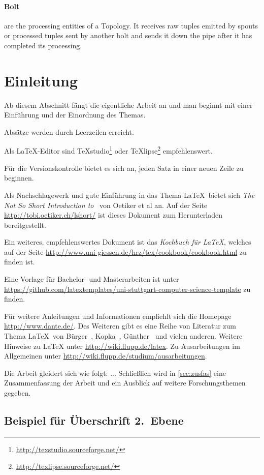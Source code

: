 \documentclass[runningheads,a4paper]{llncs}[2015/06/24]
\begin{document}
\paragraph{Bolt} are the processing entities of a Topology. It receives raw tuples emitted by spouts or processed tuples sent by another bolt and sends it down the pipe after it has completed its processing.

\section{Einleitung}
Ab diesem Abschnitt fängt die eigentliche Arbeit an und man beginnt mit einer Einführung und der Einordnung des Themas.

Absätze werden durch Leerzeilen erreicht.

Als \LaTeX-Editor sind TeXstudio\footnote{\url{http://texstudio.sourceforge.net/}} oder TeXlipse\footnote{\url{http://texlipse.sourceforge.net/}} empfehlenswert.

Für die Versionskontrolle bietet es sich an, jeden Satz in einer neuen Zeile zu beginnen.

Als Nachschlagewerk und gute Einführung in das Thema \LaTeX\ bietet sich \emph{The Not So Short Introduction to \LaTeXe}\ von Oetiker et al an.
Auf der Seite \url{http://tobi.oetiker.ch/lshort/} ist dieses Dokument zum Herunterladen bereitgestellt.

Ein weiteres, empfehlenswertes Dokument ist das \emph{Kochbuch für \LaTeX{}}, welches auf der Seite \url{http://www.uni-giessen.de/hrz/tex/cookbook/cookbook.html} zu finden ist.

Eine Vorlage für Bachelor- und Masterarbeiten ist unter \url{https://github.com/latextemplates/uni-stuttgart-computer-science-template} zu finden.

Für weitere Anleitungen und Informationen empfiehlt sich die Homepage \url{http://www.dante.de/}.
Des Weiteren gibt es eine Reihe von Literatur zum Thema \LaTeX\ von Bürger~\cite{buerger}, Kopka~\cite{kopka}, Günther~\cite{guenther} und vielen anderen.
Weitere Hinweise zu \LaTeX{} unter \url{http://wiki.flupp.de/latex}.
Zu Ausarbeitungen im Allgemeinen unter \url{http://wiki.flupp.de/studium/ausarbeitungen}.

Die Arbeit gleidert sich wie folgt:
...
Schließlich wird in \cref{sec:zusfas} eine Zusammenfassung der Arbeit und ein Ausblick auf weitere Forschungsthemen gegeben.

\subsection{Beispiel für Überschrift 2.~Ebene}
\end{document}
